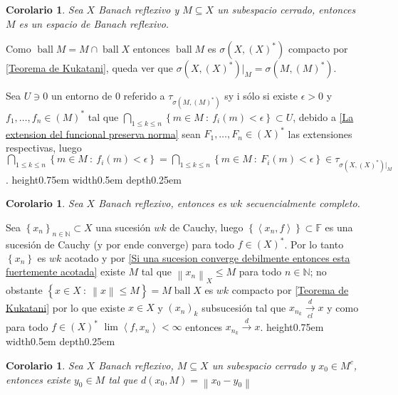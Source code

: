 \documentclass[11pt]{article}
\newcommand{\N}{{\mathbb{N}}}
\newcommand\tq{~:~}
\newcommand{\dual}[1]{\left(#1\right)^{\ast}}
\newcommand{\norm}[1]{\left\lVert#1\right\rVert}
\newcommand{\ip}[1]{\left\langle#1\right\rangle}
\newcommand{\sett}[1]{\left\lbrace#1\right\rbrace}
\newcommand{\Bigcap}[2]{\bigcap\limits_{#1}{#2}}
\DeclareMathOperator{\ball}{ball}
\numberwithin{theorem}{subsection}
\newtheorem{corollary}[theorem]{Corolario}
\newenvironment{proof}[1][Demostraci\'on]{\begin{trivlist}
		\item[\hskip \labelsep {\bfseries #1}]}{\end{trivlist}}
\newcommand{\qed}{\nobreak \ifvmode \relax \else
	\ifdim\lastskip<1.5em \hskip-\lastskip
	\hskip1.5em plus0em minus0.5em \fi \nobreak
	\vrule height0.75em width0.5em depth0.25em\fi}
\begin{document}
\begin{corollary}
	\label{Subespacio de Reflexivo es reflexivo}
	Sea $X$ Banach reflexivo y $M \subseteq X$ un subespacio cerrado, entonces $M$ es un espacio de Banach reflexivo.
\end{corollary}

\begin{proof}
	Como $\ball M = M \cap \ball X$ entonces $\ball M$ es $\sigma(X, \dual{X})$ compacto por \ref{Teorema de Kukatani}, queda ver que $\sigma \left(X, \dual{X}\right) \vert_{M}  = \sigma(M, \dual{M})$.
	
	Sea $U \ni 0$ un entorno de $0$ referido a $\tau_{\sigma(M, \dual{M})}$ sy i s\'olo si existe $\epsilon > 0$ y $f_1,\dots, f_n \in \dual{M}$ tal que $\Bigcap{1 \leq k \leq n}{\sett{m \in M \tq f_i(m) < \epsilon}} \subset U$, debido a \ref{La extension del funcional preserva norma} sean $F_1, \dots, F_n \in \dual{X}$ las extensiones respectivas, luego $\Bigcap{1 \leq k \leq n}{\sett{m \in M \tq f_i(m) < \epsilon}} = \Bigcap{1 \leq k \leq n}{\sett{m \in M \tq F_i(m) < \epsilon}} \in \tau_{\sigma \left(X, \dual{X}\right) \vert_{M}}$. \qed
	
\end{proof}

\begin{corollary}
	\label{Banach reflexivo es debilmente secuencialmente completo}
	Sea $X$ Banach reflexivo, entonces es $wk$ secuencialmente completo.
\end{corollary}

\begin{proof}
	Sea $\sett{x_n}_{n \in \N} \subset X$ una sucesi\'on $wk$ de Cauchy, luego $\sett{\ip{x_n,f}} \subset \mathbb{F}$ es una sucesi\'on de Cauchy (y por ende converge) para todo $f \in \dual{X}$. Por lo tanto $\sett{x_n}$ es $wk$ acotado y por \ref{Si una sucesion converge debilmente entonces esta fuertemente acotada} existe $M$ tal que $\norm{x_n}_X \leq M$ para todo $n \in \N$; no obstante $\sett{x \in X \tq \norm{x} \leq M} = M \ball X$ es $wk$ compacto por \ref{Teorema de Kukatani} por lo que existe $x \in X$ y $\left(x_n\right)_k$ subsucesi\'on tal que $x_{n_k} \xrightarrow[cl]{d} x$ y como para todo $f \in \dual{X}$ $\lim \ip{f,x_n} < \infty$ entonces $x_{n_k} \xrightarrow{d} x$. \qed
\end{proof}

\begin{corollary}
	\label{En banach reflexivo se realiza la distancia}
	Sea $X$ Banach reflexivo, $M \subseteq X$ un subespacio cerrado y $x_0 \in M^c$, entonces existe $y_0 \in M$ tal que $d(x_0, M) = \norm{x_0-y_0}$
\end{corollary}
\end{document}
